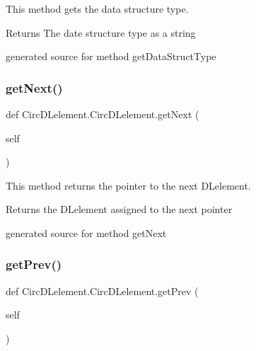 This method gets the data structure type. 

\begin{DoxyReturn}{Returns}
The date structure type as a string\begin{DoxyVerb}generated source for method getDataStructType \end{DoxyVerb}
 
\end{DoxyReturn}
\hypertarget{class_circ_d_lelement_1_1_circ_d_lelement_a17f5b17575fc29e7671fc7d543460cc9}{}\label{class_circ_d_lelement_1_1_circ_d_lelement_a17f5b17575fc29e7671fc7d543460cc9} 
\subsubsection{\texorpdfstring{get\+Next()}{getNext()}}
{\footnotesize\ttfamily def Circ\+D\+Lelement.\+Circ\+D\+Lelement.\+get\+Next (\begin{DoxyParamCaption}\item[{}]{self }\end{DoxyParamCaption})}



This method returns the pointer to the next D\+Lelement. 

\begin{DoxyReturn}{Returns}
the D\+Lelement assigned to the next pointer\begin{DoxyVerb}generated source for method getNext \end{DoxyVerb}
 
\end{DoxyReturn}
\hypertarget{class_circ_d_lelement_1_1_circ_d_lelement_a834d1744b8e043bee01898cadb33ec7f}{}\label{class_circ_d_lelement_1_1_circ_d_lelement_a834d1744b8e043bee01898cadb33ec7f} 
\subsubsection{\texorpdfstring{get\+Prev()}{getPrev()}}
{\footnotesize\ttfamily def Circ\+D\+Lelement.\+Circ\+D\+Lelement.\+get\+Prev (\begin{DoxyParamCaption}\item[{}]{self }\end{DoxyParamCaption})}



